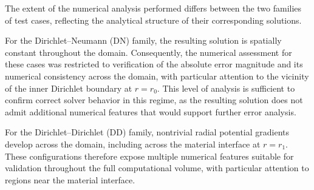 The extent of the numerical analysis performed differs between the two families of test cases, reflecting the analytical structure of their corresponding solutions.

For the Dirichlet--Neumann (DN) family, the resulting solution is spatially constant throughout the domain.
Consequently, the numerical assessment for these cases was restricted to verification of the absolute error magnitude and its numerical consistency across the domain, with particular attention to the vicinity of the inner Dirichlet boundary at $r = r_0$. This level of analysis is sufficient to confirm correct solver behavior in this regime, as the resulting solution does not admit additional numerical features that would support further error analysis.


For the Dirichlet--Dirichlet (DD) family, nontrivial radial potential gradients develop across the domain, including across the material interface at $r = r_1$.
These configurations therefore expose multiple numerical features suitable for validation throughout the full computational volume, with particular attention to
regions near the material interface.

